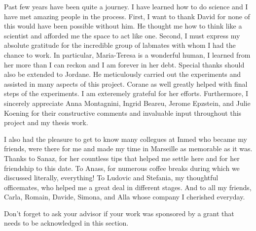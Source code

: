 Past few years have been quite a journey.
I have learned how to do science and I have met amazing people in the process.
First, I want to thank David for none of this would have been possible without him.
He thought me how to think like a scientist and afforded me the space to act like one.
Second, I must express my absolute gratitude for the incredible group of labmates with whom I had the chance to work.
In particular, Maria-Teresa is a wonderful human, I learned from her more than I can reckon and I am forever in her debt.
Special thanks should also be extended to Jordane.
He meticulously carried out the experiments and assisted in many aspects of this project.
Corane as well greatly helped with final steps of the experiments.
I am exteremely grateful for her efforts.
Furthermore, I sincerely appreciate Anna Montagnini, Ingrid Beareu, Jerome Epzstein, and Julie Koening for their constructive comments and invaluable input throughout this project and my thesis work.
\par
I also had the pleasure to get to know many collegues at Inmed who became my friends, were there for me and made my time in Marseille as memorable as it was.
Thanks to Sanaz, for her countless tips that helped me settle here and for her friendship to this date.
To Anass, for numerous coffee breaks during which we discussed literally, everything!
To Ludovic and Stefania, my thoughtful officemates, who helped me a great deal in different stages.
And to all my friends, Carla, Romain, Davide, Simona, and Alla whose company I cherished everyday.






Don't forget to ask your advisor if your work was sponsored by a grant that needs to be acknowledged in this section.  
